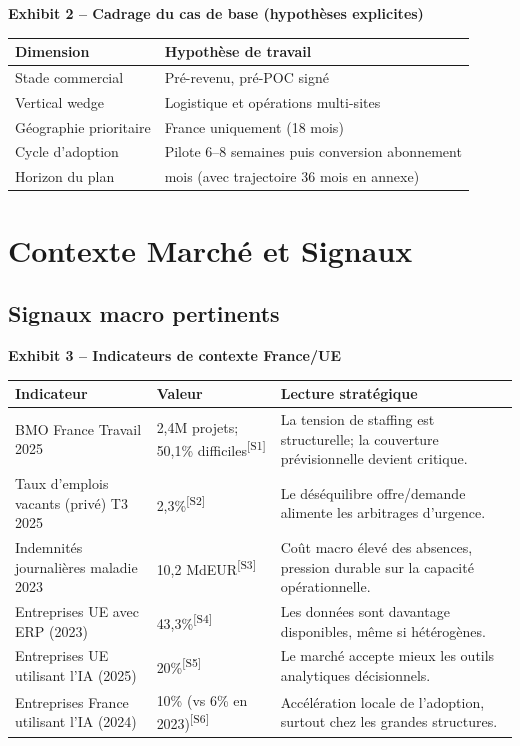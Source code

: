 \documentclass[11pt,a4paper]{article}
\newcommand{\srcref}[1]{\textsuperscript{\textcolor{PraedixaBlue}{[#1]}}}
\newcommand{\exhibit}[1]{\vspace{2mm}\noindent\colorbox{PraedixaLight}{\parbox{\dimexpr\linewidth-2\fboxsep\relax}{\textbf{#1}}}\vspace{1mm}}
\begin{document}
\exhibit{Exhibit 2 -- Cadrage du cas de base (hypothèses explicites)}
\begin{tabularx}{\linewidth}{@{}l>{\raggedright\arraybackslash}X@{}}
\toprule
\textbf{Dimension} & \textbf{Hypothèse de travail} \\
\midrule
Stade commercial & Pré-revenu, pré-POC signé \\
Vertical wedge & Logistique et opérations multi-sites \\
Géographie prioritaire & France uniquement (18 mois) \\
Cycle d'adoption & Pilote 6--8 semaines puis conversion abonnement \\
Horizon du plan & 18 mois (avec trajectoire 36 mois en annexe) \\
\bottomrule
\end{tabularx}

\section{Contexte Marché et Signaux}
\subsection{Signaux macro pertinents}
\exhibit{Exhibit 3 -- Indicateurs de contexte France/UE}
\begin{tabularx}{\linewidth}{@{}l l >{\raggedright\arraybackslash}X@{}}
\toprule
\textbf{Indicateur} & \textbf{Valeur} & \textbf{Lecture stratégique} \\
\midrule
BMO France Travail 2025 & 2,4M projets; 50,1\% difficiles\srcref{S1} & La tension de staffing est structurelle; la couverture prévisionnelle devient critique. \\
Taux d'emplois vacants (privé) T3 2025 & 2,3\%\srcref{S2} & Le déséquilibre offre/demande alimente les arbitrages d'urgence. \\
Indemnités journalières maladie 2023 & 10,2 MdEUR\srcref{S3} & Coût macro élevé des absences, pression durable sur la capacité opérationnelle. \\
Entreprises UE avec ERP (2023) & 43,3\%\srcref{S4} & Les données sont davantage disponibles, même si hétérogènes. \\
Entreprises UE utilisant l'IA (2025) & 20\%\srcref{S5} & Le marché accepte mieux les outils analytiques décisionnels. \\
Entreprises France utilisant l'IA (2024) & 10\% (vs 6\% en 2023)\srcref{S6} & Accélération locale de l'adoption, surtout chez les grandes structures. \\
\bottomrule
\end{tabularx}
\end{document}
